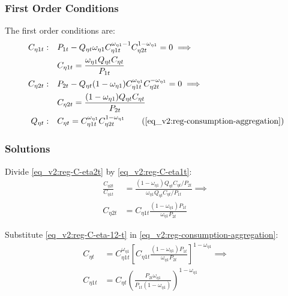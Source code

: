 \documentclass[../thesis.tex]{subfiles}
\begin{document}
\subsubsection*{First Order Conditions}

	The first order conditions are:
	\begin{align}
		C_{\eta 1 t}: &\quad P_{1 t} - Q_{\eta t} \omega_{\eta 1} C_{\eta 1 t}^{\omega_{\eta 1} - 1} C_{\eta 2 t}^{1-\omega_{\eta 1}} = 0 \implies \nonumber \\
		&\quad C_{\eta 1 t} = \frac{\omega_{\eta 1} Q_{\eta t} C_{\eta t}}{P_{1t}} \label{eq_v2:reg-C-eta1t}
		\\
		C_{\eta 2 t}: &\quad P_{2 t} - Q_{\eta t} (1 - \omega_{\eta 1}) C_{\eta 1 t}^{\omega_{\eta 1}} C_{\eta 2 t}^{-\omega_{\eta 1}} = 0 \implies \nonumber \\
		&\quad C_{\eta 2 t} = \frac{(1 - \omega_{\eta 1}) Q_{\eta t} C_{\eta t}}{P_{2t}} \label{eq_v2:reg-C-eta2t}
		\\
		Q_{\eta t}: &\quad C_{\eta t} = C_{\eta 1 t}^{\omega_{\eta 1}} C_{\eta 2 t}^{1-\omega_{\eta 1}} \tag{\ref{eq_v2:reg-consumption-aggregation}}
	\end{align}

\subsubsection*{Solutions}

	Divide \ref{eq_v2:reg-C-eta2t} by \ref{eq_v2:reg-C-eta1t}:
	\begin{align}
		\frac{C_{\eta 2 t}}{C_{\eta 1 t}} &= \frac{(1 - \omega_{\eta 1}) Q_{\eta t} C_{\eta t} / P_{2t}}{\omega_{\eta 1} Q_{\eta t} C_{\eta t} / P_{1t}} \implies \nonumber \\
		C_{\eta 2 t} &= C_{\eta 1 t} \frac{(1 - \omega_{\eta 1}) P_{1t}}{\omega_{\eta 1} P_{2t}} \label{eq_v2:reg-C-eta-12-t}
	\end{align}
	
	Substitute \ref{eq_v2:reg-C-eta-12-t} in \ref{eq_v2:reg-consumption-aggregation}:
	\begin{align}
		C_{\eta t} &= C_{\eta 1 t}^{\omega_{\eta 1}} \left[ C_{\eta 1 t} \frac{(1 - \omega_{\eta 1}) P_{1t}}{\omega_{\eta 1} P_{2t}} \right]^{1-\omega_{\eta 1}} \implies \nonumber \\
		C_{\eta 1 t} &= C_{\eta t} \left( \frac{P_{2t} \omega_{\eta 1}}{P_{1t} (1 - \omega_{\eta 1})} \right)^{1-\omega_{\eta 1}} \label{eq_v2:reg-C-eta-1-t}
	\end{align}
\end{document}
